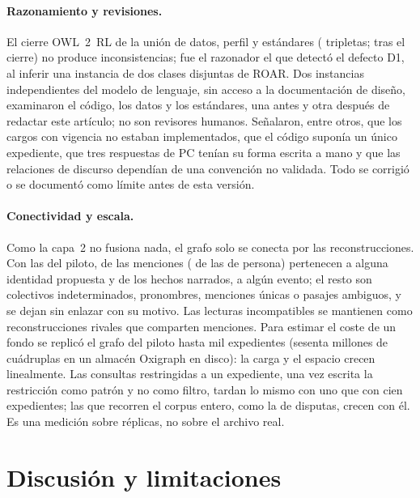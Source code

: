\documentclass[runningheads]{llncs}
\begin{document}
\paragraph{Razonamiento y revisiones.}
El cierre OWL~2~RL de la unión de datos, perfil y estándares (\cifraRazonadorTripletas{} tripletas; \cifraRazonadorCierre{} tras el cierre) no produce
inconsistencias; fue el razonador el que detectó el defecto D1, al inferir una instancia de dos clases disjuntas de
ROAR. Dos instancias independientes del modelo de lenguaje, sin acceso a la documentación de diseño, examinaron el
código, los datos y los estándares, una antes y otra después de redactar este artículo; no son revisores humanos. Señalaron, entre otros, que los cargos con vigencia
no estaban implementados, que el código suponía un único expediente, que tres respuestas de PC tenían su forma escrita
a mano y que las relaciones de discurso dependían de una convención no validada. Todo se corrigió o se documentó como
límite antes de esta versión.

\paragraph{Conectividad y escala.}
Como la capa~2 no fusiona nada, el grafo solo se conecta por las reconstrucciones. Con las del piloto,
\cifraMencionesEnlazadas{} de las \cifraMenciones{} menciones (\cifraPersonasEnlazadas{} de las \cifraPersonas{} de
persona) pertenecen a alguna identidad propuesta y \cifraHechosEnlazados{} de los \cifraHechosNarrados{} hechos
narrados, a algún evento; el resto son colectivos indeterminados, pronombres, menciones únicas o pasajes ambiguos,
y se dejan sin enlazar con su motivo. Las lecturas incompatibles se mantienen como reconstrucciones rivales que
comparten menciones. Para estimar el coste de un fondo se replicó el grafo del piloto hasta mil expedientes
(sesenta millones de cuádruplas en un almacén Oxigraph en disco): la carga y el espacio crecen linealmente. Las consultas
restringidas a un expediente, una vez escrita la restricción como patrón y no como filtro, tardan lo mismo con uno que
con cien expedientes; las que recorren el corpus entero, como la de disputas, crecen con él. Es una medición sobre
réplicas, no sobre el archivo real.

\section{Discusión y limitaciones}\label{sec:discusion}
\end{document}
